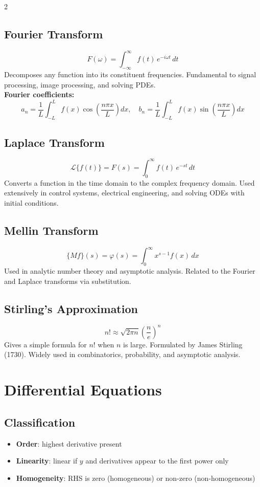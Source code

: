 \documentclass[10pt,a4paper]{article}
\begin{document}
\begin{multicols}{2}
\subsection{Fourier Transform}
\[
F(\omega) = \int_{-\infty}^{\infty} f(t)\,e^{-i\omega t}\,dt
\]
Decomposes any function into its constituent frequencies. Fundamental to signal processing, image processing, and solving PDEs.\\
\textbf{Fourier coefficients:}
\[
a_n = \frac{1}{L}\int_{-L}^{L} f(x)\cos\!\left(\frac{n\pi x}{L}\right)dx, \quad b_n = \frac{1}{L}\int_{-L}^{L} f(x)\sin\!\left(\frac{n\pi x}{L}\right)dx
\]

\subsection{Laplace Transform}
\[
\mathcal{L}\{f(t)\} = F(s) = \int_0^{\infty} f(t)\,e^{-st}\,dt
\]
Converts a function in the time domain to the complex frequency domain. Used extensively in control systems, electrical engineering, and solving ODEs with initial conditions.

\subsection{Mellin Transform}
\[
\{Mf\}(s) = \varphi(s) = \int_0^{\infty} x^{s-1} f(x)\,dx
\]
Used in analytic number theory and asymptotic analysis. Related to the Fourier and Laplace transforms via substitution.

\subsection{Stirling's Approximation}
\[
n! \approx \sqrt{2\pi n}\left(\frac{n}{e}\right)^n
\]
Gives a simple formula for $n!$ when $n$ is large. Formulated by James Stirling (1730). Widely used in combinatorics, probability, and asymptotic analysis.

\section{Differential Equations}

\subsection{Classification}
\begin{itemize}
\item \textbf{Order}: highest derivative present
\item \textbf{Linearity}: linear if $y$ and derivatives appear to the first power only
\item \textbf{Homogeneity}: RHS is zero (homogeneous) or non-zero (non-homogeneous)
\end{itemize}


\end{multicols}
\end{document}
